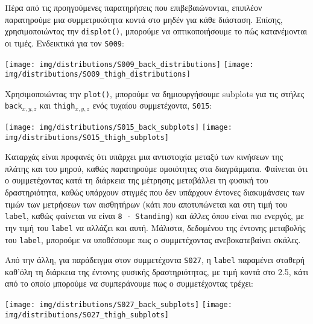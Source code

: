         Πέρα από τις προηγούμενες παρατηρήσεις που επιβεβαιώνονται, επιπλέον παρατηρούμε μια συμμετρικότητα κοντά στο μηδέν
        για κάθε διάσταση. Επίσης, χρησιμοποιώντας την \texttt{displot()}, μπορούμε να οπτικοποιήσουμε το πώς κατανέμονται οι τιμές.
        Ενδεικτικά για τον \texttt{S009}:

        \begin{multicols}{2} \centering
            \texttt{[image: img/distributions/S009\_back\_distributions]}
            \texttt{[image: img/distributions/S009\_thigh\_distributions]}
        \end{multicols}

        Χρησιμοποιώντας την \texttt{plot()}, μπορούμε να δημιουργήσουμε subplots για τις στήλες \texttt{back}\(_{x,y,z}\)
        και \texttt{thigh}\(_{x,y,z}\) ενός τυχαίου συμμετέχοντα, \texttt{S015}:

        \begin{multicols}{2} \centering
            \noindent\texttt{[image: img/distributions/S015\_back\_subplots]}
            \texttt{[image: img/distributions/S015\_thigh\_subplots]}
        \end{multicols}

        Καταρχάς είναι προφανές ότι υπάρχει μια αντιστοιχία μεταξύ των κινήσεων της πλάτης και του μηρού, καθώς παρατηρούμε ομοιότητες στα διαγράμματα.
        Φαίνεται ότι ο συμμετέχοντας κατά τη διάρκεια της μέτρησης μεταβάλλει τη φυσική του δραστηριότητα, καθώς υπάρχουν στιγμές που δεν
        υπάρχουν έντονες διακυμάνσεις των τιμών των μετρήσεων των αισθητήρων (κάτι που αποτυπώνεται και στη τιμή του \texttt{label}, καθώς φαίνεται να είναι \texttt{8 - Standing})
        και άλλες όπου είναι πιο ενεργός, με την τιμή του \texttt{label} να αλλάζει και αυτή. Μάλιστα, δεδομένου της έντονης μεταβολής του \texttt{label},
        μπορούμε να υποθέσουμε πως ο συμμετέχοντας ανεβοκατεβαίνει σκάλες.

        Από την άλλη, για παράδειγμα στον συμμετέχοντα \texttt{S027}, η \texttt{label} παραμένει σταθερή καθ'όλη τη διάρκεια της έντονης φυσικής δραστηριότητας,
        με τιμή κοντά στο 2.5, κάτι από το οποίο μπορούμε να συμπεράνουμε πως ο συμμετέχοντας τρέχει:

        \pagebreak
        \begin{multicols}{2} \centering
            \noindent\texttt{[image: img/distributions/S027\_back\_subplots]}
            \texttt{[image: img/distributions/S027\_thigh\_subplots]}
        \end{multicols}

